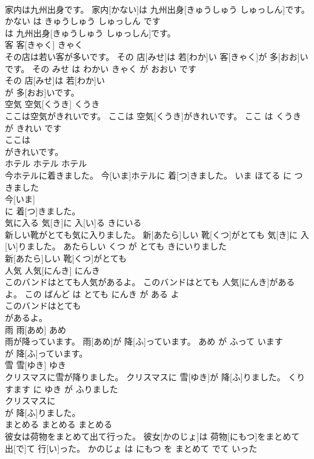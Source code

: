 \documentclass[8pt]{extreport}
\begin{document}
\begin{CJK}{UTF8}{min}
\\	家内は九州出身です。	家内[かない]は 九州出身[きゅうしゅう しゅっしん]です。	かない は きゅうしゅう しゅっしん です	
\\	は 九州出身[きゅうしゅう しゅっしん]です。		
\\	客	客[きゃく]	きゃく	
\\	その店は若い客が多いです。	その 店[みせ]は 若[わか]い 客[きゃく]が 多[おお]いです。	その みせ は わかい きゃく が おおい です	
\\	その 店[みせ]は 若[わか]い
\\	が 多[おお]いです。		
\\	空気	空気[くうき]	くうき	
\\	ここは空気がきれいです。	ここは 空気[くうき]がきれいです。	ここ は くうき が きれい です	
\\	ここは
\\	がきれいです。		
\\	ホテル	ホテル	ホテル	
\\	今ホテルに着きました。	今[いま]ホテルに 着[つ]きました。	いま ほてる に つきました	
\\	今[いま]
\\	に 着[つ]きました。		
\\	気に入る	気[き]に 入[い]る	きにいる	
\\	新しい靴がとても気に入りました。	新[あたら]しい 靴[くつ]がとても 気[き]に 入[い]りました。	あたらしい くつ が とても きにいりました	
\\	新[あたら]しい 靴[くつ]がとても
\\	人気	人気[にんき]	にんき	
\\	このバンドはとても人気があるよ。	このバンドはとても 人気[にんき]があるよ。	この ばんど は とても にんき が ある よ	
\\	このバンドはとても
\\	があるよ。		
\\	雨	雨[あめ]	あめ	
\\	雨が降っています。	雨[あめ]が 降[ふ]っています。	あめ が ふって います	
\\	が 降[ふ]っています。		
\\	雪	雪[ゆき]	ゆき	
\\	クリスマスに雪が降りました。	クリスマスに 雪[ゆき]が 降[ふ]りました。	くりすます に ゆき が ふりました	
\\	クリスマスに
\\	が 降[ふ]りました。		
\\	まとめる	まとめる	まとめる	
\\	彼女は荷物をまとめて出て行った。	彼女[かのじょ]は 荷物[にもつ]をまとめて 出[で]て 行[い]った。	かのじょ は にもつ を まとめて でて いった	

\end{CJK}
\end{document}
